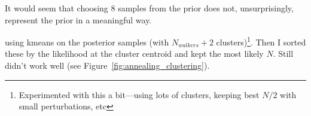 \documentclass{tufte-handout}
\begin{document}
It would seem that choosing 8 samples from the prior does not, unsurprisingly,
represent the prior in a meaningful way. 

using kmeans on the posterior samples (with $N_{walkers}+2$
clusters)\footnote{Experimented with this a bit---using lots of
  clusters, keeping best $N/2$ with small perturbations, etc}. Then I sorted these by the
likelihood at the cluster centroid and kept the most likely $N$.
Still didn't work well (see Figure~\ref{fig:annealing_clustering}).
\end{document}
